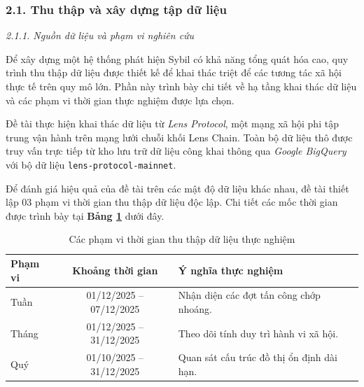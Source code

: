 \subsubsection{2.1. Thu thập và xây dựng tập dữ liệu }

\textit{2.1.1. Nguồn dữ liệu và phạm vi nghiên cứu}\vspace{0.2cm}

\indent Để xây dựng một hệ thống phát hiện Sybil có khả năng tổng quát hóa cao, quy trình thu thập dữ liệu được thiết kế để khai thác triệt để các tương tác xã hội thực tế trên quy mô lớn. Phần này trình bày chi tiết về hạ tầng khai thác dữ liệu và các phạm vi thời gian thực nghiệm được lựa chọn.\vspace{0.3cm}

Đề tài thực hiện khai thác dữ liệu từ \textit{Lens Protocol}, một mạng xã hội phi tập trung vận hành trên mạng lưới chuỗi khối Lens Chain. Toàn bộ dữ liệu thô được truy vấn trực tiếp từ kho lưu trữ dữ liệu công khai thông qua \textit{Google BigQuery} với bộ dữ liệu \texttt{lens-protocol-mainnet}.\vspace{0.3cm}

Để đánh giá hiệu quả của đề tài trên các mật độ dữ liệu khác nhau, đề tài thiết lập 03 phạm vi thời gian thu thập dữ liệu độc lập. Chi tiết các mốc thời gian được trình bày tại \textbf{Bảng \ref{tab:TimeScopes}} dưới đây.

\begin{table}[H]
    \centering
    \caption{Các phạm vi thời gian thu thập dữ liệu thực nghiệm}
    \label{tab:TimeScopes}
    \setlength{\tabcolsep}{10pt}
    \renewcommand{\arraystretch}{1.3}
    \begin{tabular}{|l|c|l|}
        \hline
        \textbf{Phạm vi} & \textbf{Khoảng thời gian} & \textbf{Ý nghĩa thực nghiệm} \\ \hline
        Tuần & 01/12/2025 -- 07/12/2025 & Nhận diện các đợt tấn công chớp nhoáng. \\ \hline
        Tháng & 01/12/2025 -- 31/12/2025 & Theo dõi tính duy trì hành vi xã hội. \\ \hline
        Quý & 01/10/2025 -- 31/12/2025 & Quan sát cấu trúc đồ thị ổn định dài hạn. \\ \hline
    \end{tabular}
\end{table}

